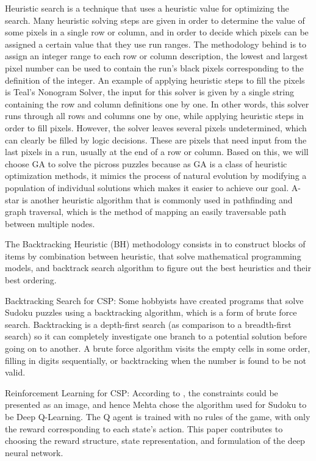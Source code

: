 \documentclass{svproc}
\begin{document}
Heuristic search is a technique that uses a heuristic value for optimizing the search. Many heuristic solving steps are given in order to determine the value of some pixels in a single row or column\cite{Salcedo}, and in order to decide which pixels can be assigned a certain value that they use run ranges\cite{CHYU}. The methodology behind is to assign an integer range to each row or column description, the lowest and largest pixel number can be used to contain the run’s black pixels corresponding to the definition of the integer. An example of applying heuristic steps to fill the pixels is Teal’s Nonogram Solver\cite{Teal}, the input for this solver is given by a single string containing the row and column definitions one by one. In other words, this solver runs through all rows and columns one by one, while applying heuristic steps in order to fill pixels. However, the solver leaves several pixels undetermined, which can clearly be filled by logic decisions. These are pixels that need input from the last pixels in a run, usually at the end of a row or column. Based on this, we will choose GA to solve the picross puzzles because as GA is a class of heuristic optimization methods, it mimics the process of natural evolution by modifying a population of individual solutions which makes it easier to achieve our goal. A-star is another heuristic algorithm that is commonly used in pathfinding and graph traversal, which is the method of mapping an easily traversable path between multiple nodes\cite{astar}.

The Backtracking Heuristic (BH) methodology consists in to construct blocks of items by combination between heuristic, that solve mathematical programming models, and backtrack search algorithm to figure out the best heuristics and their best ordering\cite{BH}.

Backtracking Search for CSP: Some hobbyists have created programs that solve Sudoku puzzles using a backtracking algorithm, which is a form of brute force search\cite{brute}. Backtracking is a depth-first search (as comparison to a breadth-first search) so it can completely investigate one branch to a potential solution before going on to another. A brute force algorithm visits the empty cells in some order, filling in digits sequentially, or backtracking when the number is found to be not valid\cite{Peter,lecture}.

Reinforcement Learning for CSP: According to \cite{Qlearning}, the constraints could be presented as an image, and hence Mehta chose the algorithm used for Sudoku to be Deep Q-Learning. The Q agent is trained with no rules of the game, with only the reward corresponding to each state's action. This paper\cite{Qlearning} contributes to choosing the reward structure, state representation, and formulation of the deep neural network.
\end{document}
